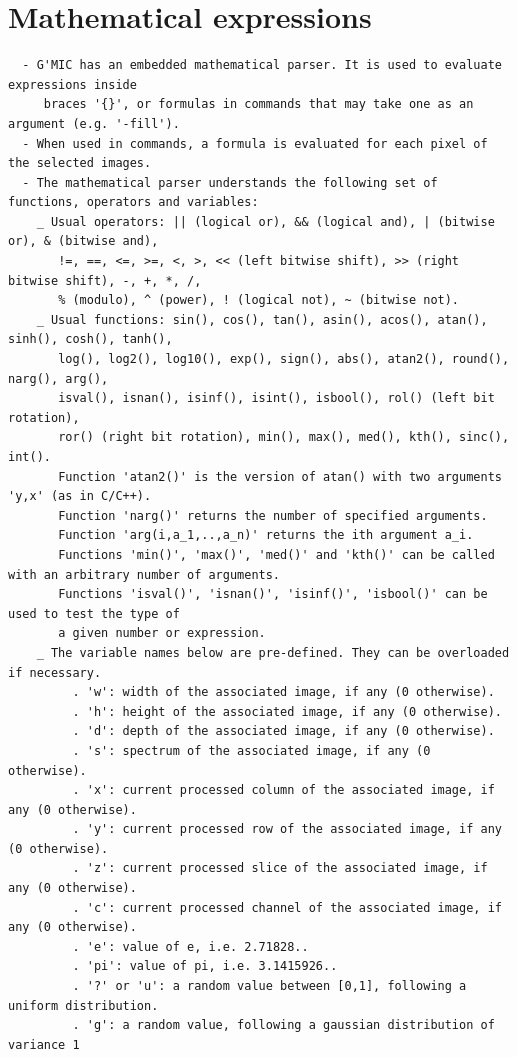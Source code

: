 \documentclass[a4paper,11pt,twoside]{book}
\begin{document}
\section{Mathematical expressions}
\small
\begin{lstlisting}
  - G'MIC has an embedded mathematical parser. It is used to evaluate expressions inside 
     braces '{}', or formulas in commands that may take one as an argument (e.g. '-fill'). 
  - When used in commands, a formula is evaluated for each pixel of the selected images. 
  - The mathematical parser understands the following set of functions, operators and variables: 
    _ Usual operators: || (logical or), && (logical and), | (bitwise or), & (bitwise and), 
       !=, ==, <=, >=, <, >, << (left bitwise shift), >> (right bitwise shift), -, +, *, /, 
       % (modulo), ^ (power), ! (logical not), ~ (bitwise not). 
    _ Usual functions: sin(), cos(), tan(), asin(), acos(), atan(), sinh(), cosh(), tanh(), 
       log(), log2(), log10(), exp(), sign(), abs(), atan2(), round(), narg(), arg(), 
       isval(), isnan(), isinf(), isint(), isbool(), rol() (left bit rotation), 
       ror() (right bit rotation), min(), max(), med(), kth(), sinc(), int(). 
       Function 'atan2()' is the version of atan() with two arguments 'y,x' (as in C/C++). 
       Function 'narg()' returns the number of specified arguments. 
       Function 'arg(i,a_1,..,a_n)' returns the ith argument a_i. 
       Functions 'min()', 'max()', 'med()' and 'kth()' can be called with an arbitrary number of arguments. 
       Functions 'isval()', 'isnan()', 'isinf()', 'isbool()' can be used to test the type of 
       a given number or expression. 
    _ The variable names below are pre-defined. They can be overloaded if necessary. 
         . 'w': width of the associated image, if any (0 otherwise). 
         . 'h': height of the associated image, if any (0 otherwise). 
         . 'd': depth of the associated image, if any (0 otherwise). 
         . 's': spectrum of the associated image, if any (0 otherwise). 
         . 'x': current processed column of the associated image, if any (0 otherwise). 
         . 'y': current processed row of the associated image, if any (0 otherwise). 
         . 'z': current processed slice of the associated image, if any (0 otherwise). 
         . 'c': current processed channel of the associated image, if any (0 otherwise). 
         . 'e': value of e, i.e. 2.71828.. 
         . 'pi': value of pi, i.e. 3.1415926.. 
         . '?' or 'u': a random value between [0,1], following a uniform distribution. 
         . 'g': a random value, following a gaussian distribution of variance 1 

\end{lstlisting}
\end{document}
